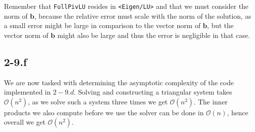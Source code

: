 \documentclass{article}
\begin{document}
\noindent Remember that \verb|FullPivLU| resides in \verb|<Eigen/LU>| and that we must consider the norm of $\mathbf{b}$, because the relative error must scale with the norm of the solution, as a small error might be large in comparison to the vector norm of $\mathbf{b}$, but the vector norm of $\mathbf{b}$ might also be large and thus the error is negligible in that case.
\subsection*{2-9.f} 
We are now tasked with determining the asymptotic complexity of the code implemented in $2-9.d$. Solving and constructing a triangular system takes $\mathcal{O}\left(n^{2}\right)$, as we solve such a system three times we get $\mathcal{O}\left(n^{2}\right)$. The inner products we also compute before we use the solver can be done in $\mathcal{O}\left(n\right)$, hence overall we get $\mathcal{O}\left(n^{2}\right)$.
\end{document}
